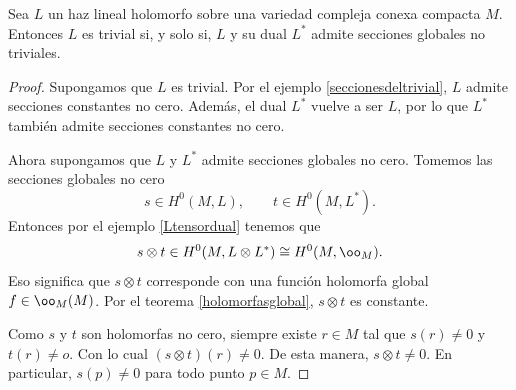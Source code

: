 	\begin{lemma}\label{seccionesnotriviales}
		Sea $L$ un haz lineal holomorfo sobre una variedad compleja conexa compacta $M$. Entonces $L$ es trivial si, y solo si, $L$ y su dual $L^*$ admite secciones globales no triviales.  
	\end{lemma}
	\begin{proof}
		Supongamos que $L$ es trivial. Por el ejemplo \ref{seccionesdeltrivial}, $L$ admite secciones constantes no cero. Además, el dual $L^*$ vuelve a ser $L$, por lo que $L^*$ también admite secciones constantes no cero.
		
		Ahora supongamos que $L$ y $L^*$ admite secciones globales no cero. Tomemos las secciones globales no cero
		\begin{equation*}
			s\in H^0(M,L),
			\qquad
			t\in H^0(M,L^*).
		\end{equation*}
		Entonces por el ejemplo \ref{Ltensordual} tenemos que
		\begin{equation*}
			s\otimes t\in H^0(M,L\otimes L^*)\cong H^0(M,\oo_M).
		\end{equation*}
		Eso significa que $s\otimes t$ corresponde con una función holomorfa global $f\in \oo_M(M)$. Por el teorema \ref{holomorfasglobal}, $s\otimes t$ es constante. 
		
		Como $s$ y $t$ son holomorfas no cero, siempre existe $r\in M$ tal que $s(r)\neq 0$ y $t(r)\neq o$. Con lo cual $(s\otimes t)(r)\neq 0$. De esta manera, $s\otimes t\neq 0$. En particular, $s(p)\neq 0$ para todo punto $p\in M$.
		

\end{proof}
